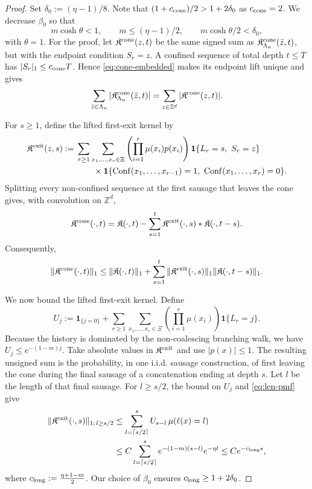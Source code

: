 \documentclass[letterpaper,11pt,reqno]{amsart}
\theoremstyle{definition}
\newcommand{\IK}{\mathfrak{K}}
\begin{document}
\begin{proof}
Set \(\delta_0:=(\eta-1)/8\). Note that $(1+c_{\rm cone})/2>1+2\delta_0$ as $c_{\rm cone}=2$.
We decrease \(\beta_0\) so that
\[
        m\cosh\theta<1,
        \qquad
        m\le(\eta-1)/2,
        \qquad
        m\cosh\theta/2<\delta_0,
\]
with $\theta=1$.
For the proof, let \(\IK^{\rm cone}(z,t)\) be the same signed sum as
\(\IK_{\Lambda_n}^{\rm cone}(\bar z,t)\), but with the endpoint condition
\(S_r=z\). A confined sequence of total depth \(t\le T\) has
\(|S_r|_1\le c_{\rm cone}T\). Hence \eqref{eq:cone-embedded} makes its endpoint
lift unique and gives
\begin{equation}\label{eq:cone-lift-l1}
\sum_{\bar z\in\Lambda_n}|\IK_{\Lambda_n}^{\rm cone}(\bar z,t)|
=
\sum_{z\in\mathbb Z^d}|\IK^{\rm cone}(z,t)|.
\end{equation}

For \(s\ge1\), define the lifted first-exit kernel by
\[
\begin{aligned}
\IK^{\rm exit}(z,s)
:={}&
\sum_{r\ge1}
\sum_{x_1,\ldots,x_r\in\Xi}
\left(\prod_{i=1}^r\mu(x_i)p(x_i)\right)
\mathbf 1\{L_r=s,\ S_r=z\}\\
&\qquad\times
\mathbf 1\{\operatorname{Conf}(x_1,\ldots,x_{r-1})=1,
\ \operatorname{Conf}(x_1,\ldots,x_r)=0\}.
\end{aligned}
\]
Splitting every non-confined sequence at the first sausage that leaves the cone gives, with
convolution on \(\mathbb Z^d\),
\[
\IK^{\rm cone}(\cdot,t)
=
\IK(\cdot,t)
-
\sum_{s=1}^t
\IK^{\rm exit}(\cdot,s)*\IK(\cdot,t-s).
\]
Consequently,
\begin{equation}\label{eq:cone-first-exit-convolution}
\|\IK^{\rm cone}(\cdot,t)\|_1
\le
\|\IK(\cdot,t)\|_1
+
\sum_{s=1}^t
\|\IK^{\rm exit}(\cdot,s)\|_1
\|\IK(\cdot,t-s)\|_1.
\end{equation}

We now bound the lifted first-exit kernel. Define
\[
U_j
:=
\mathbf 1_{\{j=0\}}
+
\sum_{r\ge1}
\sum_{x_1,\ldots,x_r\in\Xi}
\left(\prod_{i=1}^r\mu(x_i)\right)
\mathbf 1\{L_r=j\}.
\]
Because the history is
dominated by the non-coalescing branching walk, we have $U_j\leq e^{-(1-m)j}$. 
%
Take absolute values in \(\IK^{\rm exit}\) and use \(|p(x)|\le1\). The resulting
unsigned sum is the probability, in one i.i.d. sausage construction, of first leaving the cone
during the final sausage of a concatenation ending at depth \(s\). Let \(l\) be the length of
that final sausage. For \(l\ge s/2\), the bound on \(U_j\) and
\eqref{eq:len-pmf} give
\begin{align*}
\|\IK^{\rm exit}(\cdot,s)\|_{1;\,l\ge s/2}
&\le
\sum_{l=\lceil s/2\rceil}^s U_{s-l}\,\mu(\ell(x)=l)\\
&\le
C\sum_{l=\lceil s/2\rceil}^s
e^{-(1-m)(s-l)}e^{-\eta l}
\le
Ce^{-c_{\rm long}s},
\end{align*}
where $c_{\rm long}:=\frac{\eta+1-m}{2}$. 
Our choice of \(\beta_0\) ensures \(c_{\rm long}\ge1+2\delta_0\).


\end{proof}
\end{document}
